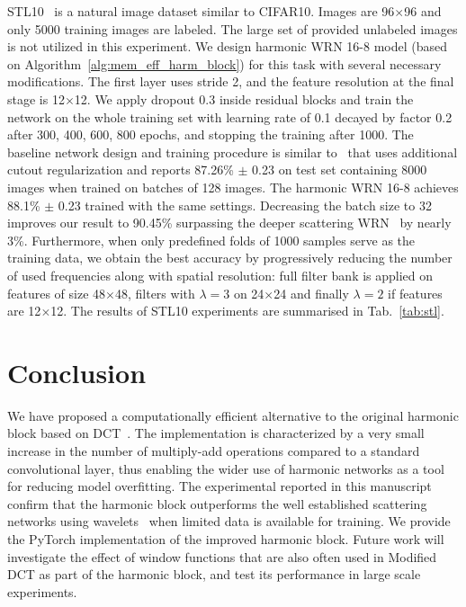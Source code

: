\documentclass[conference]{IEEEtran}
\begin{document}
STL10~\cite{STL10} is a natural image dataset similar to CIFAR10. Images are 96$\times$96 and only 5000 training images are labeled. The large set of provided unlabeled images is not utilized in this experiment. We design harmonic WRN 16-8 model (based on Algorithm~\ref{alg:mem_eff_harm_block}) for this task with several necessary modifications. The first layer uses stride 2, and the feature resolution at the final stage is 12$\times$12. We apply dropout 0.3 inside residual blocks and train the network on the whole training set with learning rate of 0.1 decayed by factor 0.2 after 300, 400, 600, 800 epochs, and stopping the training after 1000. The baseline network design and training procedure is similar to~\cite{Devries17} that uses additional cutout regularization and reports 87.26\% $\pm$ 0.23 on test set containing 8000 images when trained on batches of 128 images. The harmonic WRN 16-8 achieves 88.1\% $\pm$ 0.23 trained with the same settings. Decreasing the batch size to 32 improves our result to 90.45\% surpassing the deeper scattering WRN~\cite{Oyallon18} by nearly 3\%. Furthermore, when only predefined folds of 1000 samples serve as the training data, we obtain the best accuracy by progressively reducing the number of used frequencies along with spatial resolution: full filter bank is applied on features of size 48$\times$48, filters with $\lambda=3$ on 24$\times$24 and finally $\lambda=2$ if features are 12$\times$12. The results of STL10 experiments are summarised in Tab.~\ref{tab:stl}.

\section{Conclusion}

We have proposed a computationally efficient alternative to the original harmonic block based on DCT~\cite{Ulicny18}. The implementation is characterized by a very small increase in the number of multiply-add operations compared to a standard convolutional layer, thus enabling the wider use of harmonic networks as a tool for reducing model overfitting.
The experimental reported in this manuscript confirm that the harmonic block outperforms the well established scattering networks using wavelets~\cite{Bruna13,Oyallon18} when limited data is available for training. We provide the PyTorch implementation of the improved harmonic block.
Future work will investigate the effect of window functions that are also often used in Modified DCT as part of the harmonic block, and test its performance in large scale experiments. 



\end{document}
